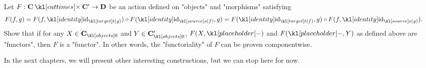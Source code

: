 \documentclass[main.tex]{subfiles}
\begin{document}
\begin{exer}\label{exer:catfunc:funccomponent}
	Let $F: \mathbf{C} \cattimes \mathbf{C}' \rightarrow \mathbf{D}$ be an action defined on "objects" and "morphisms" satisfying \[F(f,g) = F(f,\id_{\target(g)}) \circ F(\id_{\source(f)},g) = F(\id_{\target(f)},g) \circ F(f,\id_{\source(g)}).\] Show that if for any $X \in \obj{\mathbf{C}}$ and $Y \in \obj{\mathbf{C}'}$, $F(X, \placeholder)$ and $F(\placeholder,Y)$ as defined above are "functors", then $F$ is a "functor". In other words, the "functoriality" of $F$ can be proven componentwise.
\end{exer}
In the next chapters, we will present other interesting constructions, but we can stop here for now.
\end{document}
